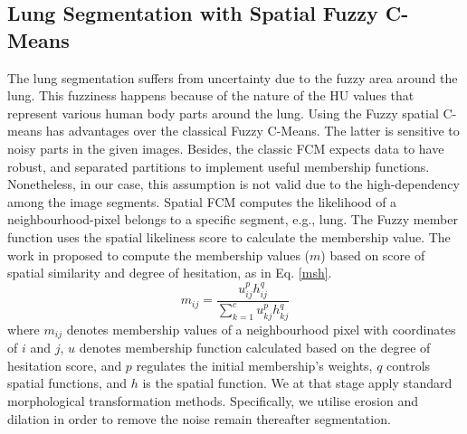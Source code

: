 \documentclass[conference]{IEEEtran}
\begin{document}
\subsection{Lung Segmentation with Spatial Fuzzy C-Means}
The lung segmentation suffers from uncertainty due to the fuzzy area around the lung. This fuzziness happens because of the nature of the HU values that represent various human body parts around the lung. Using the Fuzzy spatial C-means has advantages over the classical Fuzzy C-Means. The latter is sensitive to noisy parts in the given images. Besides, the classic FCM expects data to have robust, and separated partitions to implement useful membership functions. Nonetheless, in our case, this assumption is not valid due to the high-dependency among the image segments. Spatial FCM computes the likelihood of a neighbourhood-pixel belongs to a specific segment, e.g., lung. The Fuzzy member function uses the spatial likeliness score to calculate the membership value. The work in \cite{tripathy2014image} proposed to compute the membership values ($m$) based on score of spatial similarity and degree of hesitation, as in Eq. \ref{msh}.
\begin{equation}\label{msh}
m_{ij}=\frac{u_{ij}^{p}h_{ij}^{q}}{\sum\limits_{k=1}^{c}u_{kj}^{ p}h_{kj}^{q}}
\end{equation}
where $m_{ij}$ denotes membership values of a neighbourhood pixel with coordinates of $i$ and $j$, $u$ denotes membership function calculated based on the degree of hesitation score, and $p$ regulates the initial membership's weights, $q$ controls spatial functions, and $h$ is the spatial function. We at that stage apply standard morphological transformation methods. Specifically, we utilise erosion and dilation in order to remove the noise remain thereafter segmentation. 

\end{document}
